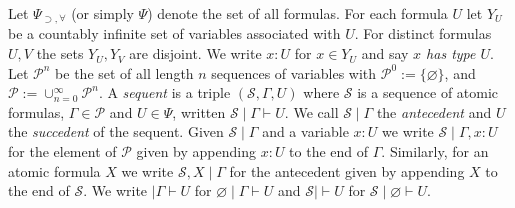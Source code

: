 \documentclass[12pt]{article}
\numberwithin{thm}{subsection}
\numberwithin{defn}{subsection}
\numberwithin{lemma}{subsection}
\numberwithin{example}{subsection}
\numberwithin{notation}{subsection}
\numberwithin{cor}{subsection}
\numberwithin{remark}{subsection}
\numberwithin{condition}{subsection}
\numberwithin{question}{subsection}
\numberwithin{construction}{subsection}
\newcommand{\call}[1]{\mathcal{#1}}
\newcommand{\imp}{\supset}
\theoremstyle{example}
\numberwithin{equation}{section}
\begin{document}
Let $\Psi_{\imp,\forall}$ (or simply $\Psi$) denote the set of all formulas. For each formula $U$ let $Y_U$ be a countably infinite set of variables associated with $U$. For distinct formulas $U,V$ the sets $Y_U, Y_V$ are disjoint. We write $x : U$ for $x \in Y_U$ and say \emph{$x$ has type $U$}. Let $\call{P}^n$ be the set of all length $n$ sequences of variables with $\call{P}^0 := \lbrace \varnothing \rbrace$, and $\call{P} := \cup_{n = 0}^\infty \call{P}^n$. A \emph{sequent} is a triple $(\call{S},\Gamma,U)$ where $\call{S}$ is a sequence of atomic formulas, $\Gamma \in \call{P}$ and $U \in \Psi$, written $\call{S}\mid\Gamma \vdash U$. We call $\call{S}\mid\Gamma$ the \emph{antecedent} and $U$ the \emph{succedent} of the sequent. Given $\call{S}\mid\Gamma$ and a variable $x:U$ we write $\call{S}\mid\Gamma, x:U$ for the element of $\call{P}$ given by appending $x:U$ to the end of $\Gamma$. Similarly, for an atomic formula $X$ we write $\call{S},X\mid\Gamma$ for the antecedent given by appending $X$ to the end of $\call{S}$. We write $\mid\Gamma \vdash U$ for $\varnothing\mid\Gamma \vdash U$ and $\call{S} \mid \vdash U$ for $\call{S} \mid \varnothing \vdash U$.
\end{document}
